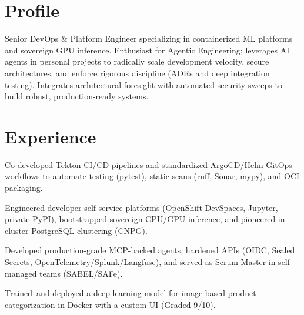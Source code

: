 \documentclass[a4paper]{deedy-resume} %
\begin{document}
\begin{minipage}[t]{0.62\textwidth} %
\vspace{0em}

\section{Profile}
\raggedright{
Senior DevOps \& Platform Engineer specializing in containerized ML platforms and sovereign GPU inference. Enthusiast for Agentic Engineering; leverages AI agents in personal projects to radically scale development velocity, secure architectures, and enforce rigorous discipline (ADRs and deep integration testing). Integrates architectural foresight with automated security sweeps to build robust, production-ready systems.
}
\sectionspace

\section{Experience}

\vspace{\topsep} %
\begin{tightitemize}
\item Co-developed Tekton CI/CD pipelines and standardized ArgoCD/Helm GitOps workflows to automate testing (pytest), static scans (ruff, Sonar, mypy), and OCI packaging.
\item Engineered developer self-service platforms (OpenShift DevSpaces, Jupyter, private PyPI), bootstrapped sovereign CPU/GPU inference, and pioneered in-cluster PostgreSQL clustering (CNPG).
\item Developed production-grade MCP-backed agents, hardened APIs (OIDC, Sealed Secrets, OpenTelemetry/Splunk/Langfuse), and served as Scrum Master in self-managed teams (SABEL/SAFe).
\end{tightitemize}
\sectionspace

\begin{tightitemize}
\item Trained\ and deployed a deep learning model for image-based product categorization in Docker with a custom UI (Graded 9/10).
\end{tightitemize}
\sectionspace


\end{minipage}
\end{document}
